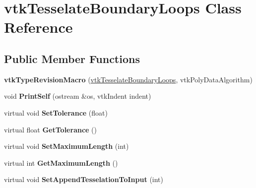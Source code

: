 \hypertarget{classvtkTesselateBoundaryLoops}{
\section{vtkTesselateBoundaryLoops Class Reference}
\label{classvtkTesselateBoundaryLoops}
}
\subsection*{Public Member Functions}
\begin{DoxyCompactItemize}
\item 
\hypertarget{classvtkTesselateBoundaryLoops_a08c05aa06778a5102bda9d129c2f4a10}{
{\bfseries vtkTypeRevisionMacro} (\hyperlink{classvtkTesselateBoundaryLoops}{vtkTesselateBoundaryLoops}, vtkPolyDataAlgorithm)}
\label{classvtkTesselateBoundaryLoops_a08c05aa06778a5102bda9d129c2f4a10}

\item 
\hypertarget{classvtkTesselateBoundaryLoops_ad41350a4c60c99c97108f5dd3ef28445}{
void {\bfseries PrintSelf} (ostream \&os, vtkIndent indent)}
\label{classvtkTesselateBoundaryLoops_ad41350a4c60c99c97108f5dd3ef28445}

\item 
\hypertarget{classvtkTesselateBoundaryLoops_a71b29992e5359d34d276384e4d793f4b}{
virtual void {\bfseries SetTolerance} (float)}
\label{classvtkTesselateBoundaryLoops_a71b29992e5359d34d276384e4d793f4b}

\item 
\hypertarget{classvtkTesselateBoundaryLoops_a06af78dc2b873193e570c8187f61703c}{
virtual float {\bfseries GetTolerance} ()}
\label{classvtkTesselateBoundaryLoops_a06af78dc2b873193e570c8187f61703c}

\item 
\hypertarget{classvtkTesselateBoundaryLoops_af408cfae7b8fc6a6d689903939edfc74}{
virtual void {\bfseries SetMaximumLength} (int)}
\label{classvtkTesselateBoundaryLoops_af408cfae7b8fc6a6d689903939edfc74}

\item 
\hypertarget{classvtkTesselateBoundaryLoops_adece8bf03b125d4e9555e99ce88d2722}{
virtual int {\bfseries GetMaximumLength} ()}
\label{classvtkTesselateBoundaryLoops_adece8bf03b125d4e9555e99ce88d2722}

\item 
\hypertarget{classvtkTesselateBoundaryLoops_a8868c427fa1d9fec317b58dedd580248}{
virtual void {\bfseries SetAppendTesselationToInput} (int)}
\label{classvtkTesselateBoundaryLoops_a8868c427fa1d9fec317b58dedd580248}


\end{DoxyCompactItemize}
